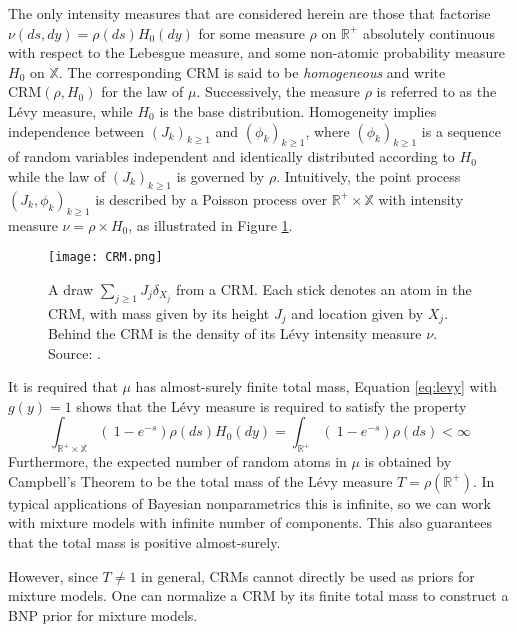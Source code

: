 The only intensity measures that are considered herein are those that factorise $\nu(ds, dy) = \rho(ds)H_0(dy)$ for some measure $\rho$ on $\mathbb{R}^+$ absolutely continuous with respect to the Lebesgue measure, and some non-atomic probability measure $H_0$ on $\mathbb{X}$. The corresponding \gls{CRM} is said to be \textit{homogeneous} and write $\text{CRM}(\rho, H_0)$ for the law of $\mu$. Successively, the measure $\rho$ is referred to as the Lévy measure, while $H_0$ is the base distribution.
Homogeneity implies independence between $\left(J_k \right)_{k\ge1}$ and $\left(\phi_k \right)_{k\ge1}$, where $\left(\phi_k \right)_{k\ge1}$ is a sequence of random variables independent and identically distributed according to $H_0$ while the law of $\left(J_k \right)_{k\ge1}$  is governed by $\rho$. Intuitively, the point process $\left(J_k, \phi_k \right)_{k\ge1}$  is described by a Poisson process over $\mathbb{R}^+ \times \mathbb{X}$ with intensity measure $\nu = \rho \times H_0$, as illustrated in Figure \ref{fig:CRM}.

\begin{figure}[h!]
\centering
    \texttt{[image: CRM.png]} 
    \caption{A draw $\sum_{j \ge 1}{J_j \delta_{X_j}}$ from a \gls{CRM}. Each stick denotes an atom in the \gls{CRM}, with mass given by its height $J_j$ and location given by $X_j$. Behind the \gls{CRM} is the density of its Lévy intensity measure $\nu$. Source: \cite{Favaro:2013fl}.}
    \label{fig:CRM} 
\end{figure}

It is required that $\mu$ has almost-surely finite total mass, Equation \ref{eq:levy} with $g(y)=1$ shows that the Lévy measure is required to satisfy the property
$$ \int_{\mathbb{R}^+ \times \mathbb{X}} \left( \  1 - e^{-s} \right) \rho(ds) H_0(dy) = 
\int_{\mathbb{R}^+} \left( \  1 - e^{-s} \right) \rho(ds) < \infty $$
Furthermore, the expected number of random atoms in $\mu$ is obtained by Campbell’s Theorem to be the total mass of the Lévy measure $T = \rho(\mathbb{R}^+)$. In typical applications of Bayesian nonparametrics this is infinite, so we can work with mixture models with infinite number of components. This also guarantees that the total mass is positive almost-surely. 

However, since $T \neq 1$ in general, \glspl{CRM} cannot directly be used as priors for mixture models.
One can normalize a \gls{CRM} by its finite total mass to construct a BNP prior for mixture models.\\

